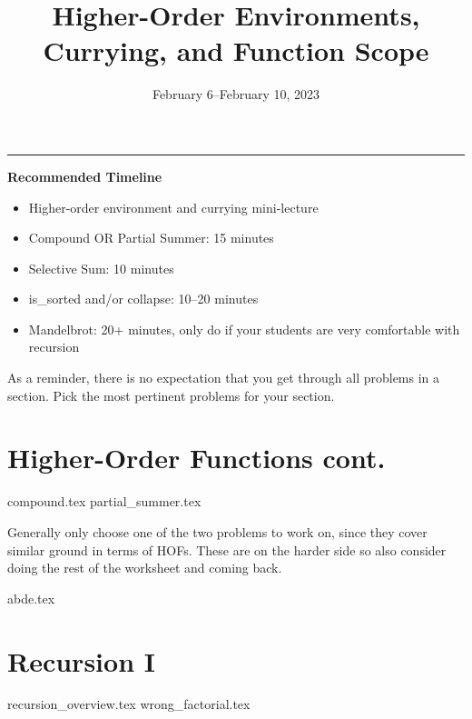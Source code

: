 \documentclass{exam}
\title{Higher-Order Environments, Currying, and Function Scope}
\date{February 6--February 10, 2023}
\begin{document}
\maketitle
\rule{\textwidth}{0.15em}
\fontsize{12}{15}\selectfont

\begin{meta}
\textbf{Recommended Timeline}
\begin{itemize}
    \item Higher-order environment and currying mini-lecture
    \item Compound OR Partial Summer: 15 minutes
    \item Selective Sum: 10 minutes
    \item is\_sorted and/or collapse: 10--20 minutes
    \item Mandelbrot: 20+ minutes, only do if your students are very comfortable with recursion
\end{itemize}
As a reminder, there is no expectation that you get through all problems in a section. Pick the most pertinent problems for your section. 
\end{meta}

\begin{questions}
    \section{Higher-Order Functions cont.}
    {compound.tex}
    {partial_summer.tex}
    \begin{questionmeta}
        Generally only choose one of the two problems to work on, since they cover similar ground in terms of HOFs. These are on the harder side so also consider doing the rest of the worksheet and coming back.
    \end{questionmeta}

    {abde.tex}

    \section{Recursion I}
    {recursion_overview.tex}
    {wrong_factorial.tex}
\end{questions}
\end{document}
